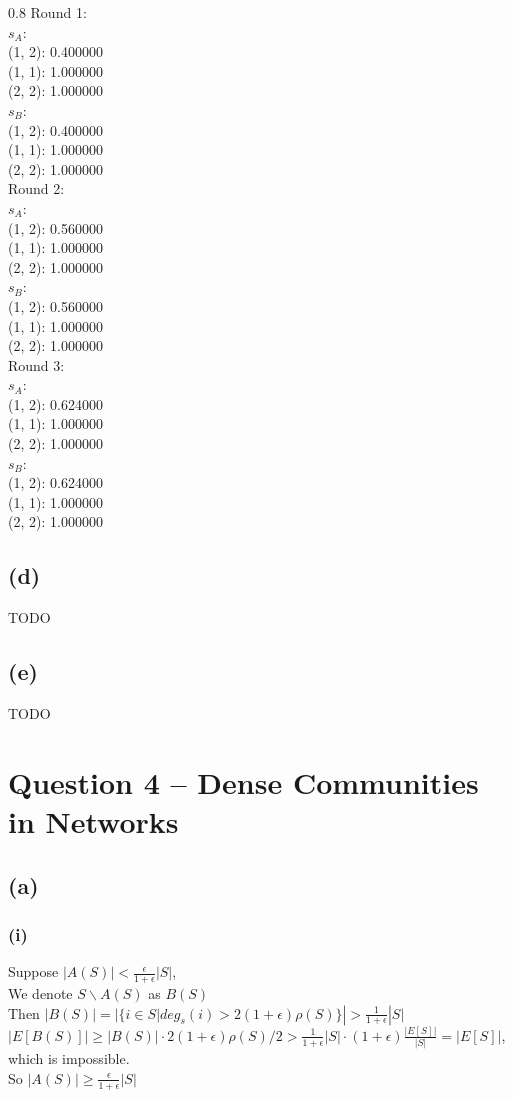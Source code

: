 \documentclass{article}
\newenvironment{myenv}[1]
  {\begin{spacing}{#1}}
  {\end{spacing}}
\begin{document}
\begin{myenv}{0.8}
Round 1:\\ 
$s_A$:\\
(1, 2): 0.400000 \\
(1, 1): 1.000000 \\
(2, 2): 1.000000 \\
$s_B$:\\
(1, 2): 0.400000 \\
(1, 1): 1.000000 \\
(2, 2): 1.000000 \\
Round 2:\\ 
$s_A$:\\
(1, 2): 0.560000 \\
(1, 1): 1.000000 \\
(2, 2): 1.000000 \\
$s_B$:\\
(1, 2): 0.560000 \\
(1, 1): 1.000000 \\
(2, 2): 1.000000 \\
Round 3:\\ 
$s_A$:\\
(1, 2): 0.624000 \\
(1, 1): 1.000000 \\
(2, 2): 1.000000 \\
$s_B$:\\
(1, 2): 0.624000 \\
(1, 1): 1.000000 \\
(2, 2): 1.000000 \\
\end{myenv}

\subsection{(d)}
TODO

\subsection{(e)}
TODO

\section{Question 4 -- Dense Communities in Networks}
\subsection{(a)}
\subsubsection{(i)}
Suppose $|A(S)| < \frac{\epsilon}{1+\epsilon}|S|$, \\
We denote $S\backslash A(S)$ as $B(S)$ \\
Then $|B(S)| = |\{i \in S | deg_s(i) > 2(1 + \epsilon)\rho(S)\}| > \frac{1}{1 + \epsilon}|S|$ \\
$|E[B(S)]| \ge |B(S)| \cdot 2(1 + \epsilon)\rho(S)/2 > \frac{1}{1 + \epsilon}|S| \cdot (1 + \epsilon)\frac{|E[S]|}{|S|} = |E[S]|$, which is impossible. \\
So $|A(S)| \ge \frac{\epsilon}{1+\epsilon}|S|$
\end{document}
